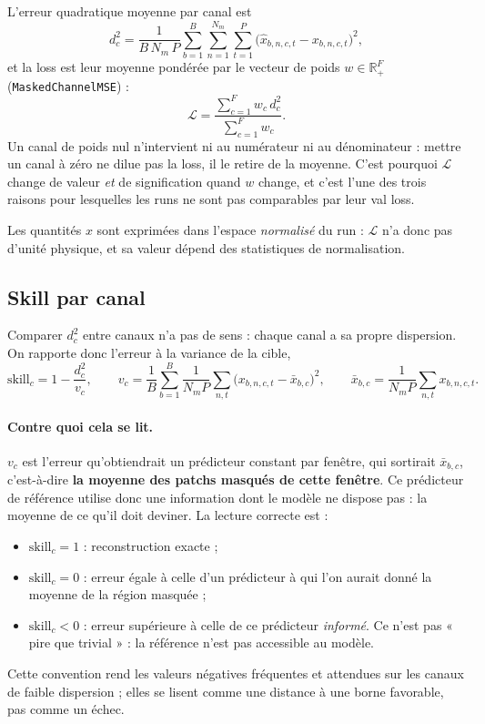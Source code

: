 \documentclass{article}
\begin{document}
L'erreur quadratique moyenne par canal est
\begin{equation}
d_c^2 = \frac{1}{B\,N_m\,P}\sum_{b=1}^{B}\sum_{n=1}^{N_m}\sum_{t=1}^{P}\bigl(\hat{x}_{b,n,c,t}-x_{b,n,c,t}\bigr)^2 ,
\end{equation}
et la loss est leur moyenne pondérée par le vecteur de poids $w \in \mathbb{R}_+^F$ (\texttt{MaskedChannelMSE}) :
\begin{equation}
\mathcal{L} = \frac{\sum_{c=1}^{F} w_c\, d_c^2}{\sum_{c=1}^{F} w_c}.
\label{eq:loss}
\end{equation}
Un canal de poids nul n'intervient ni au numérateur ni au dénominateur : mettre un canal à zéro ne dilue pas la loss, il le retire de la moyenne. C'est pourquoi $\mathcal{L}$ change de valeur \emph{et} de signification quand $w$ change, et c'est l'une des trois raisons pour lesquelles les runs ne sont pas comparables par leur val loss.

Les quantités $x$ sont exprimées dans l'espace \emph{normalisé} du run : $\mathcal{L}$ n'a donc pas d'unité physique, et sa valeur dépend des statistiques de normalisation.

\subsection{Skill par canal}

Comparer $d_c^2$ entre canaux n'a pas de sens : chaque canal a sa propre dispersion. On rapporte donc l'erreur à la variance de la cible,
\begin{equation}
\mathrm{skill}_c = 1 - \frac{d_c^2}{v_c},
\qquad
v_c = \frac{1}{B}\sum_{b=1}^{B} \frac{1}{N_m P}\sum_{n,t}\bigl(x_{b,n,c,t} - \bar{x}_{b,c}\bigr)^2 ,
\qquad
\bar{x}_{b,c} = \frac{1}{N_m P}\sum_{n,t} x_{b,n,c,t}.
\end{equation}

\paragraph{Contre quoi cela se lit.} $v_c$ est l'erreur qu'obtiendrait un prédicteur constant par fenêtre, qui sortirait $\bar{x}_{b,c}$, c'est-à-dire \textbf{la moyenne des patchs masqués de cette fenêtre}. Ce prédicteur de référence utilise donc une information dont le modèle ne dispose pas : la moyenne de ce qu'il doit deviner. La lecture correcte est :
\begin{itemize}
    \item $\mathrm{skill}_c = 1$ : reconstruction exacte ;
    \item $\mathrm{skill}_c = 0$ : erreur égale à celle d'un prédicteur à qui l'on aurait donné la moyenne de la région masquée ;
    \item $\mathrm{skill}_c < 0$ : erreur supérieure à celle de ce prédicteur \emph{informé}. Ce n'est pas « pire que trivial » : la référence n'est pas accessible au modèle.
\end{itemize}
Cette convention rend les valeurs négatives fréquentes et attendues sur les canaux de faible dispersion ; elles se lisent comme une distance à une borne favorable, pas comme un échec.
\end{document}
